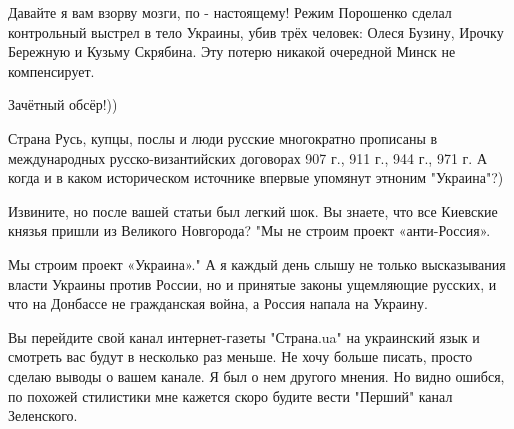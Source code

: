 \begin{itemize}
 

Давайте я вам взорву мозги, по - настоящему! Режим Порошенко сделал контрольный
выстрел в тело Украины, убив трёх человек: Олеся Бузину, Ирочку Бережную и
Кузьму Скрябина. Эту потерю никакой очередной Минск не компенсирует.

 
Зачётный обсёр!))

 

Страна Русь, купцы, послы и люди русские многократно прописаны в международных
русско-византийских договорах 907 г., 911 г., 944 г., 971 г. А когда и в каком
историческом источнике впервые упомянут этноним "Украина"?)

 

Извините, но после вашей статьи был легкий шок. Вы знаете, что все Киевские
князья пришли из Великого Новгорода? "Мы не строим проект «анти-Россия». 

Мы строим проект «Украина»." А я каждый день слышу не только высказывания
власти Украины против России, но и принятые законы ущемляющие русских, и что на
Донбассе не гражданская война, а Россия напала на Украину. 

Вы перейдите свой канал интернет-газеты "Страна.ua" на украинский язык и
смотреть вас будут в несколько раз меньше. Не хочу больше писать, просто сделаю
выводы о вашем канале. Я был о нем другого мнения. Но видно ошибся, по похожей
стилистики мне кажется скоро будите вести "Перший" канал Зеленского.

 

\end{itemize}
